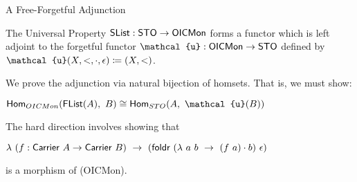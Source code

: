 \documentclass{beamer}
\begin{document}
\begin{frame}{A Free-Forgetful Adjunction}
\begin{block}{The Universal Property}
   $\AgdaDatatype{SList} : \AgdaDatatype{STO} \to \AgdaDatatype{OICMon}$ forms a functor which is left adjoint to the forgetful functor $\AgdaDatatype{\ensuremath{\mathcal{u}}} : \AgdaDatatype{OICMon} \to \AgdaDatatype{STO}$ defined by $\AgdaDatatype{\ensuremath{\mathcal{u}}}(X,<,\cdot,\epsilon) \coloneq (X,<)$.
 \end{block}
 \pause
We prove the adjunction via natural bijection of homsets. That is, we must show:

\begin{center}
  $\mathsf{Hom}_{OICMon}(\AgdaDatatype{FList}(A),~B) \cong \mathsf{Hom}_{STO}(A,~ \AgdaDatatype{\ensuremath{\mathcal{u}}}(B))$
\end{center}
\pause

The hard direction involves showing that
\begin{center}
$\lambda~(f : \AgdaField{Carrier}~A \to \AgdaField{Carrier}~B)~\to~(\AgdaFunction{foldr}~(\lambda~a~b~\to~(f~a) \cdot b)~\epsilon)$
\end{center}
is a morphism of \AgdaDatatype(OICMon).


\end{frame}
\end{document}
